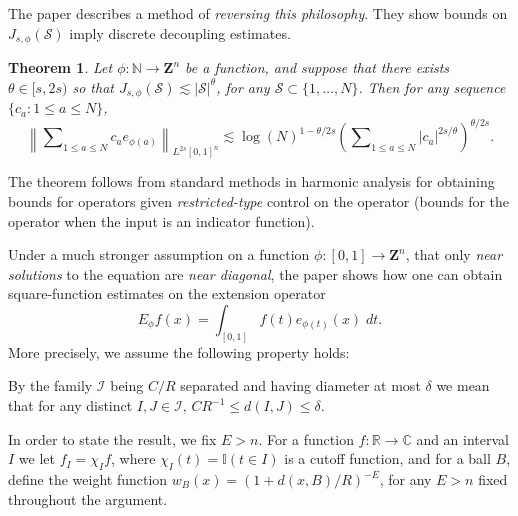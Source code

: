 \documentclass[12pt]{article}
\newtheorem{theorem}{Theorem}
\begin{document}
The paper \cite{dujdjf} describes a method of \emph{reversing this philosophy}. They show bounds on $J_{s,\phi}(\mathcal{S})$ imply discrete decoupling estimates.

\begin{theorem}
    Let $\phi: \mathbb{N} \to \mathbf{Z}^n$ be a function, and suppose that there exists $\theta \in [s,2s)$ so that $J_{s,\phi}(\mathcal{S}) \lesssim |\mathcal{S}|^\theta$, for any $\mathcal{S} \subset \{ 1, \dots, N \}$. Then for any sequence $\{ c_a: 1 \leq a \leq N \}$,
    \[ \left\| \sum\nolimits_{1 \leq a \leq N} c_a e_{\phi(a)} \right\|_{L^{2s}[0,1]^n} \lesssim \log(N)^{1 - \theta / 2s} \left( \sum\nolimits_{1 \leq a \leq N} |c_a|^{2s/\theta} \right)^{\theta/2s}. \]
\end{theorem}

The theorem follows from standard methods in harmonic analysis for obtaining bounds for operators given \emph{restricted-type} control on the operator (bounds for the operator when the input is an indicator function).

Under a much stronger assumption on a function $\phi: [0,1] \to \mathbf{Z}^n$, that only \emph{near solutions} to the equation are \emph{near diagonal}, the paper shows how one can obtain square-function estimates on the extension operator
%
\begin{equation}
    E_\phi f(x) = \int_{[0,1]} f(t) e_{\phi(t)}(x)\; dt.
\end{equation}
%
More precisely, we assume the following property holds:

\vspace{0.5em}
\noindent {}

\vspace{0.5em}
By the family $\mathcal{I}$ being $C/R$ separated and having diameter at most $\delta$ we mean that for any distinct $I,J \in \mathcal{I}$, $C R^{-1} \leq d(I,J) \leq \delta$.

In order to state the result, we fix $E > n$. For a function $f: \mathbb{R} \to \mathbb{C}$ and an interval $I$ we let $f_I = \chi_I f$, where  $\chi_I(t) = \mathbb{I}(t \in I)$ is a cutoff function, and for a ball $B$, define the weight function $w_B(x) = (1 + d(x,B) / R)^{-E}$, for any $E > n$ fixed throughout the argument.
\end{document}
